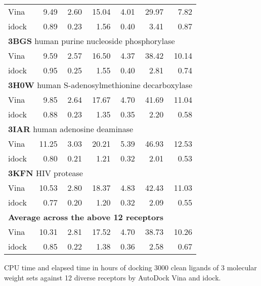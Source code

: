 \documentclass[10pt]{article}
\begin{document}
\begin{table}[!ht]
\begin{tabular}{lrrrrrr}
Vina  &  9.49 &  2.60 & 15.04 &  4.01 & 29.97 &  7.82\\
idock &  0.89 &  0.23 &  1.56 &  0.40 &  3.41 &  0.87\\
\multicolumn{7}{l}{\textbf{3BGS} human purine nucleoside phosphorylase}\\
Vina  &  9.59 &  2.57 & 16.50 &  4.37 & 38.42 & 10.14\\
idock &  0.95 &  0.25 &  1.55 &  0.40 &  2.81 &  0.74\\
\multicolumn{7}{l}{\textbf{3H0W} human S-adenosylmethionine decarboxylase}\\
Vina  &  9.85 &  2.64 & 17.67 &  4.70 & 41.69 & 11.04\\
idock &  0.88 &  0.23 &  1.35 &  0.35 &  2.20 &  0.58\\
\multicolumn{7}{l}{\textbf{3IAR} human adenosine deaminase}\\
Vina  & 11.25 &  3.03 & 20.21 &  5.39 & 46.93 & 12.53\\
idock &  0.80 &  0.21 &  1.21 &  0.32 &  2.01 &  0.53\\
\multicolumn{7}{l}{\textbf{3KFN} HIV protease}\\
Vina  & 10.53 &  2.80 & 18.37 &  4.83 & 42.43 & 11.03\\
idock &  0.77 &  0.20 &  1.20 &  0.32 &  2.09 &  0.55\\
\multicolumn{7}{l}{\textbf{Average across the above 12 receptors}}\\
Vina  & 10.31 &  2.81 & 17.52 &  4.70 & 38.73 & 10.26\\
idock &  0.85 &  0.22 &  1.38 &  0.36 &  2.58 &  0.67\\
\end{tabular}
\begin{flushleft}\label{ExecutionTime} CPU time and elapsed time in hours of docking 3000 clean ligands of 3 molecular weight sets against 12 diverse receptors by AutoDock Vina and idock.
\end{flushleft}
\label{tab:label}
 \end{table}
\end{document}

